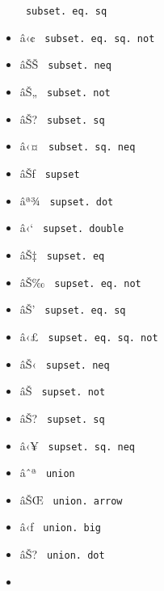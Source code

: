 \begin{itemize}
{  \texttt{\ subset.\ eq.\ sq\ }}
\item
  \label{symbol-subset.eq.sq.not}{{ â‹¢ }
  \texttt{\ subset.\ eq.\ sq.\ not\ }}
\item
  \label{symbol-subset.neq}{{ âŠŠ }
  \texttt{\ subset.\ neq\ }}
\item
  \label{symbol-subset.not}{{ âŠ„ }
  \texttt{\ subset.\ not\ }}
\item
  \label{symbol-subset.sq}{{ âŠ? }
  \texttt{\ subset.\ sq\ }}
\item
  \label{symbol-subset.sq.neq}{{ â‹¤ }
  \texttt{\ subset.\ sq.\ neq\ }}
\item
  \label{symbol-supset}{{ âŠƒ } \texttt{\ supset\ }}
\item
  \label{symbol-supset.dot}{{ âª¾ }
  \texttt{\ supset.\ dot\ }}
\item
  \label{symbol-supset.double}{{ â‹` }
  \texttt{\ supset.\ double\ }}
\item
  \label{symbol-supset.eq}{{ âŠ‡ }
  \texttt{\ supset.\ eq\ }}
\item
  \label{symbol-supset.eq.not}{{ âŠ‰ }
  \texttt{\ supset.\ eq.\ not\ }}
\item
  \label{symbol-supset.eq.sq}{{ âŠ' }
  \texttt{\ supset.\ eq.\ sq\ }}
\item
  \label{symbol-supset.eq.sq.not}{{ â‹£ }
  \texttt{\ supset.\ eq.\ sq.\ not\ }}
\item
  \label{symbol-supset.neq}{{ âŠ‹ }
  \texttt{\ supset.\ neq\ }}
\item
  \label{symbol-supset.not}{{ âŠ }
  \texttt{\ supset.\ not\ }}
\item
  \label{symbol-supset.sq}{{ âŠ? }
  \texttt{\ supset.\ sq\ }}
\item
  \label{symbol-supset.sq.neq}{{ â‹¥ }
  \texttt{\ supset.\ sq.\ neq\ }}
\item
  \label{symbol-union}{{ âˆª } \texttt{\ union\ }}
\item
  \label{symbol-union.arrow}{{ âŠŒ }
  \texttt{\ union.\ arrow\ }}
\item
  \label{symbol-union.big}{{ â‹ƒ }
  \texttt{\ union.\ big\ }}
\item
  \label{symbol-union.dot}{{ âŠ? }
  \texttt{\ union.\ dot\ }}
\item

\end{itemize}
